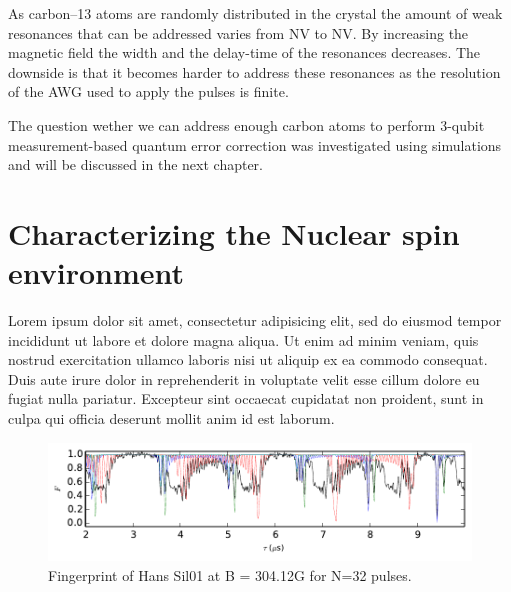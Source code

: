 As carbon--13 atoms are randomly distributed in the crystal the amount of weak resonances that can be addressed varies from NV to NV. By increasing the magnetic field the width and the delay-time of the resonances decreases. The downside is that it becomes harder to address these resonances as the resolution of the AWG used to apply the pulses is finite.

The question wether we can address enough carbon atoms to perform 3-qubit measurement-based quantum error correction was investigated using simulations and will be discussed in the next chapter.

\section{Characterizing the Nuclear spin environment}
Lorem ipsum dolor sit amet, consectetur adipisicing elit, sed do eiusmod
tempor incididunt ut labore et dolore magna aliqua. Ut enim ad minim veniam,
quis nostrud exercitation ullamco laboris nisi ut aliquip ex ea commodo
consequat. Duis aute irure dolor in reprehenderit in voluptate velit esse
cillum dolore eu fugiat nulla pariatur. Excepteur sint occaecat cupidatat non
proident, sunt in culpa qui officia deserunt mollit anim id est laborum.



\begin{figure}[htbp]
    \centering
    \includegraphics{Img/Truefingerprint.pdf}
    \caption{Fingerprint of Hans Sil01 at B = 304.12G for N=32 pulses.}
    \label{fig:FP}
\end{figure}

